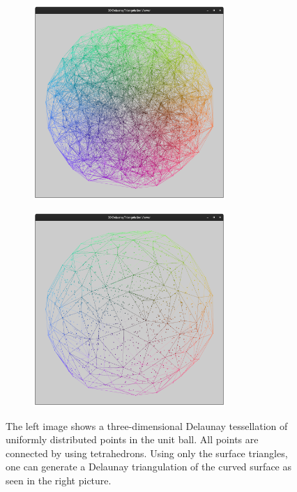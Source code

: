 \documentclass{stdlocal}
\begin{document}
    \begin{figure}
      \center
      \begin{subfigure}[b]{0.49\textwidth}
        \center
        \includegraphics[width=0.8\textwidth]{../../images/delaunay_3d.png}
      \end{subfigure}
      \begin{subfigure}[b]{0.49\textwidth}
        \center
        \includegraphics[width=0.8\textwidth]{../../images/delaunay_3d_surface.png}
      \end{subfigure}
      \caption[]{%
        The left image shows a three-dimensional Delaunay tessellation of uniformly distributed points in the unit ball.
        All points are connected by using tetrahedrons.
        Using only the surface triangles, one can generate a Delaunay triangulation of the curved surface as seen in the right picture.
      }
    \end{figure}
\end{document}
